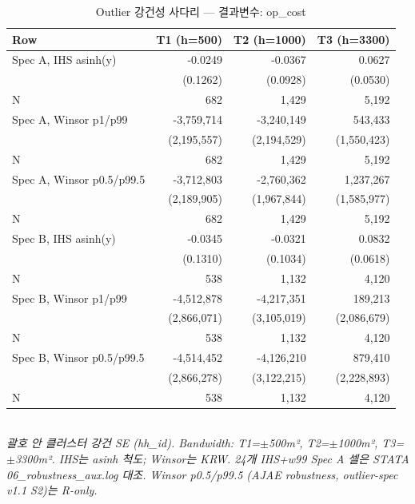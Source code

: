 \begin{table}[t]
\centering
\caption{Outlier 강건성 사다리 — 결과변수: op\_cost}
\label{tab:rob_outlier_op_cost_ko}
\begin{tabular}{lrrr}
\toprule
Row & T1 (h=500) & T2 (h=1000) & T3 (h=3300) \\
\midrule
Spec A, IHS asinh(y) & -0.0249 & -0.0367 & 0.0627 \\
        & (0.1262) & (0.0928) & (0.0530) \\
N       & 682 & 1,429 & 5,192 \\
Spec A, Winsor p1/p99 & -3,759,714 & -3,240,149 & 543,433 \\
        & (2,195,557) & (2,194,529) & (1,550,423) \\
N       & 682 & 1,429 & 5,192 \\
Spec A, Winsor p0.5/p99.5 & -3,712,803 & -2,760,362 & 1,237,267 \\
        & (2,189,905) & (1,967,844) & (1,585,977) \\
N       & 682 & 1,429 & 5,192 \\
Spec B, IHS asinh(y) & -0.0345 & -0.0321 & 0.0832 \\
        & (0.1310) & (0.1034) & (0.0618) \\
N       & 538 & 1,132 & 4,120 \\
Spec B, Winsor p1/p99 & -4,512,878 & -4,217,351 & 189,213 \\
        & (2,866,071) & (3,105,019) & (2,086,679) \\
N       & 538 & 1,132 & 4,120 \\
Spec B, Winsor p0.5/p99.5 & -4,514,452 & -4,126,210 & 879,410 \\
        & (2,866,278) & (3,122,215) & (2,228,893) \\
N       & 538 & 1,132 & 4,120 \\
\bottomrule
\end{tabular}
\\
\footnotesize\textit{괄호 안 클러스터 강건 SE (hh\_id). Bandwidth: T1=$\pm$500m², T2=$\pm$1000m², T3=$\pm$3300m². IHS는 asinh 척도; Winsor는 KRW. 24개 IHS+w99 Spec A 셀은 STATA 06\_robustness\_aux.log 대조. Winsor p0.5/p99.5 (AJAE robustness, outlier-spec v1.1 S2)는 R-only.}
\end{table}


